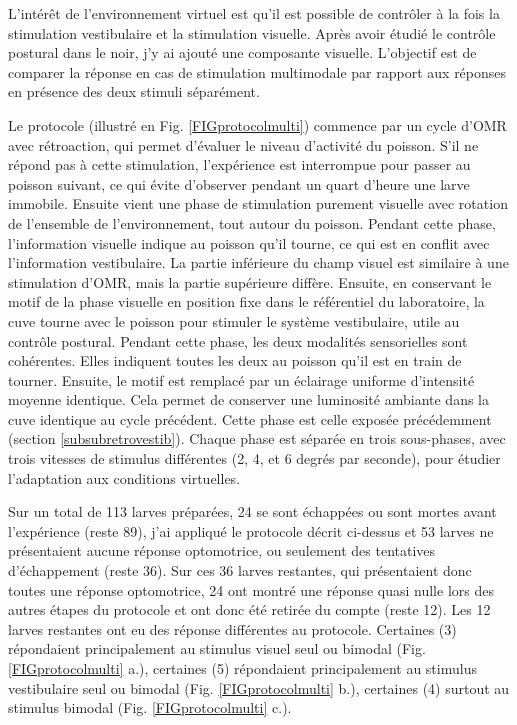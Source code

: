L'intérêt de l'environnement virtuel est qu'il est possible de contrôler à la fois la stimulation vestibulaire et la stimulation visuelle. Après avoir étudié le contrôle postural dans le noir, j'y ai ajouté une composante visuelle. L'objectif est de comparer la réponse en cas de stimulation multimodale par rapport aux réponses en présence des deux stimuli séparément.

Le protocole (illustré en Fig. \ref{FIGprotocolmulti}) commence par un cycle d'OMR avec rétroaction, qui permet d'évaluer le niveau d'activité du poisson. S'il ne répond pas à cette stimulation, l'expérience est interrompue pour passer au poisson suivant, ce qui évite d'observer pendant un quart d'heure une larve immobile. Ensuite vient une phase de stimulation purement visuelle avec rotation de l'ensemble de l'environnement, tout autour du poisson. Pendant cette phase, l'information visuelle indique au poisson qu'il tourne, ce qui est en conflit avec l'information vestibulaire. La partie inférieure du champ visuel est similaire à une stimulation d'OMR, mais la partie supérieure diffère. Ensuite, en conservant le motif de la phase visuelle en position fixe dans le référentiel du laboratoire, la cuve tourne avec le poisson pour stimuler le système vestibulaire, utile au contrôle postural. Pendant cette phase, les deux modalités sensorielles sont cohérentes. Elles indiquent toutes les deux au poisson qu'il est en train de tourner. Ensuite, le motif est remplacé par un éclairage uniforme d'intensité moyenne identique. Cela permet de conserver une luminosité ambiante dans la cuve identique au cycle précédent. Cette phase est celle exposée précédemment (section \ref{subsubretrovestib}). Chaque phase est séparée en trois sous-phases, avec trois vitesses de stimulus différentes (2, 4, et 6 degrés par seconde), pour étudier l'adaptation aux conditions virtuelles.


Sur un total de 113 larves préparées, 24 se sont échappées ou sont mortes avant l'expérience (reste 89), j'ai appliqué le protocole décrit ci-dessus et 53 larves ne présentaient aucune réponse optomotrice, ou seulement des tentatives d'échappement (reste 36). Sur ces 36 larves restantes, qui présentaient donc toutes une réponse optomotrice, 24 ont montré une réponse quasi nulle lors des autres étapes du protocole et ont donc été retirée du compte (reste 12). Les 12 larves restantes ont eu des réponse différentes au protocole. Certaines (3) répondaient principalement au stimulus visuel seul ou bimodal (Fig. \ref{FIGprotocolmulti} a.), certaines (5) répondaient principalement au stimulus vestibulaire seul ou bimodal (Fig. \ref{FIGprotocolmulti} b.), certaines (4) surtout au stimulus bimodal (Fig. \ref{FIGprotocolmulti} c.).

